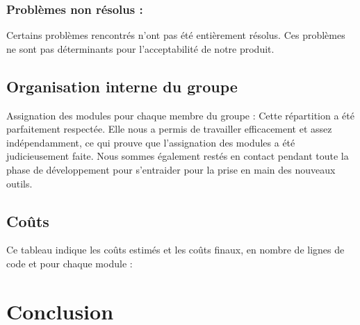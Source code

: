 			\subsubsection*{Problèmes non résolus :}
				Certains problèmes rencontrés n'ont pas été entièrement résolus. Ces problèmes ne sont pas déterminants pour l'acceptabilité de notre produit.
				
		\subsection{Organisation interne du groupe}
		Assignation des modules pour chaque membre du groupe :
		Cette répartition a été parfaitement respectée. Elle nous a permis de travailler efficacement et assez indépendamment, ce qui prouve que l'assignation des modules a été judicieusement faite. Nous sommes également restés en contact pendant toute la phase de développement pour s'entraider pour la prise en main des nouveaux outils.
	
		\subsection{Coûts}
		Ce tableau indique les coûts estimés et les coûts finaux, en nombre de lignes de code et pour chaque module :
	
	\section*{Conclusion}
	
		

